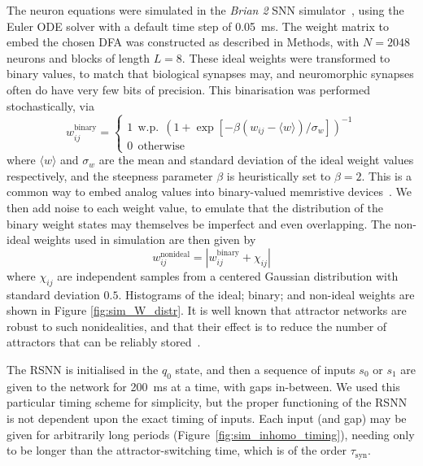 The neuron equations were simulated in the \textit{Brian 2} SNN simulator~\cite{stimberg_brian_2019}, using the Euler ODE solver with a default time step of \qty{0,05}{ms}. The weight matrix to embed the chosen DFA was constructed as described in Methods, with $N = 2048$ neurons and blocks of length $L=8$. These ideal weights were transformed to binary values, to match that biological synapses may, and neuromorphic synapses often do have very few bits of precision. This binarisation was performed stochastically, via
\begin{equation}
w_{ij}^\text{binary} = \begin{cases}
    1 \: \: \text{w.p.} \: \: ( 1 + \exp [ - \beta ( w_{ij} - \langle w \rangle ) / \sigma_w ] )^{-1} \\ 0 \: \: \text{otherwise}
\end{cases}
\end{equation}
where $\langle w \rangle $ and $\sigma_w$ are the mean and standard deviation of the ideal weight values respectively, and the steepness parameter $\beta$ is heuristically set to $\beta = 2$. This is a common way to embed analog values into binary-valued memristive devices~\cite{zahari_analogue_2020}. We then add noise to each weight value, to emulate that the distribution of the binary weight states may themselves be imperfect and even overlapping. The non-ideal weights used in simulation are then given by
\begin{equation}
w_{ij}^{\text{nonideal}} = | w_{ij}^\text{binary} + \chi_{ij}| 
\end{equation}
where $\chi_{ij}$ are independent samples from a centered Gaussian distribution with standard deviation $0.5$. Histograms of the ideal; binary; and non-ideal weights are shown in Figure \ref{fig:sim_W_distr}. It is well known that attractor networks are robust to such nonidealities, and that their effect is to reduce the number of attractors that can be reliably stored~\cite{amit_modeling_1989, sompolinsky_theory_1987, willshaw_non-holographic_1969, knoblauch_memory_2010}.

The RSNN is initialised in the $q_0$ state, and then a sequence of inputs $s_0$ or $s_1$ are given to the network for \qty{200}{ms} at a time, with gaps in-between. We used this particular timing scheme for simplicity, but the proper functioning of the RSNN is not dependent upon the exact timing of inputs. Each input (and gap) may be given for arbitrarily long periods \mbox{(Figure \ref{fig:sim_inhomo_timing})}, needing only to be longer than the attractor-switching time, which is of the order $\tau_\text{syn}$.

